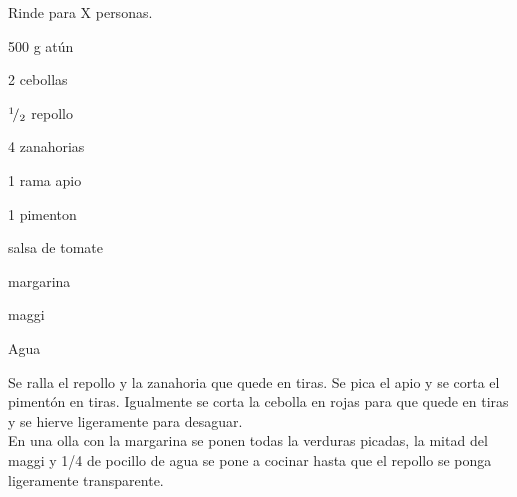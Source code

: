 
Rinde para X personas.

\begin{ingredientes}
\item 500 g atún
\item 2 cebollas
\item ${}^{1}\!/_{2}$ repollo
\item 4 zanahorias
\item 1 rama apio
\item 1 pimenton
\item salsa de tomate
\item margarina
\item maggi
\item Agua
\end{ingredientes}
\preparacion

Se ralla el repollo y la zanahoria que quede en tiras. Se pica el apio y se corta el pimentón en tiras. Igualmente se corta la cebolla en rojas para que quede en tiras y se hierve ligeramente para desaguar.\\

En una olla con la margarina se ponen todas la verduras picadas, la mitad del maggi y 1/4 de pocillo de agua se pone a cocinar hasta que el repollo se ponga ligeramente transparente.